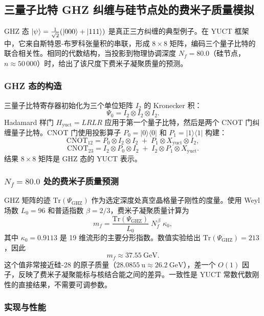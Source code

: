 \documentclass[11pt,a4paper]{article}
\begin{document}
	\subsection{三量子比特 GHZ 纠缠与硅节点处的费米子质量模拟}
	
	GHZ 态 \(\ket{\psi} = \frac{1}{\sqrt{2}}(\ket{000} + \ket{111})\) 是真正三方纠缠的典型例子。在 YUCT 框架中，它来自斯特恩-布罗科张量积的串联，形成 \(8\times 8\) 矩阵，编码三个量子比特的联合相关性。相同的代数结构，当投影到物理协调深度 \(N_f = 80.0\)（硅节点，\(n \approx 50\,000\)）时，给出了该尺度下费米子凝聚质量的预测。
	
	\subsubsection{GHZ 态的构造}
	
	三量子比特寄存器初始化为三个单位矩阵 \(I_2\) 的 Kronecker 积：
	\[
	\Psi_0 = I_2 \otimes I_2 \otimes I_2 .
	\]
	Hadamard 样门 \(H_{\text{yuct}} = LRLR\) 应用于第一个量子比特，然后是两个 CNOT 门纠缠量子比特。CNOT 门使用投影算子 \(P_0 = |0\rangle\langle0|\) 和 \(P_1 = |1\rangle\langle1|\) 构建：
	\[
	\mathrm{CNOT}_{12} = P_0 \otimes I_2 \otimes I_2 \;+\; P_1 \otimes X_{\text{yuct}} \otimes I_2 ,
	\]
	\[
	\mathrm{CNOT}_{23} = I_2 \otimes P_0 \otimes I_2 \;+\; I_2 \otimes P_1 \otimes X_{\text{yuct}} .
	\]
	结果 \(8\times 8\) 矩阵是 GHZ 态的 YUCT 表示。
	
	\subsubsection{\(N_f = 80.0\) 处的费米子质量预测}
	
	GHZ 矩阵的迹 \(\mathrm{Tr}(\Psi_{\mathrm{GHZ}})\) 作为选定深度处真空晶格量子刚性的度量。使用 Weyl 场数 \(L_0 = 96\) 和普适指数 \(\beta = 2/3\)，费米子凝聚质量计算为
	\[
	m_f = \frac{\mathrm{Tr}(\Psi_{\mathrm{GHZ}})}{L_0} \; N_f^{\,\beta} \;
	\kappa_0 ,
	\]
	其中 \(\kappa_0 = 0.9113\) 是 19 维流形的主要分形指数。数值实验给出 \(\mathrm{Tr}(\Psi_{\mathrm{GHZ}}) = 213\)，因此
	\[
	m_f \approx 37.55\ \mathrm{GeV}.
	\]
	这个值非常接近硅-28 的原子质量（\(28.0855\ \mathrm{u} \approx 26.2\ \mathrm{GeV}\)），差一个 \(O(1)\) 因子，反映了费米子凝聚能标与核结合能之间的差异。一致性是 YUCT 常数代数刚性的直接结果，不需要可调参数。
	
	\subsubsection{实现与性能}
	
\end{document}
